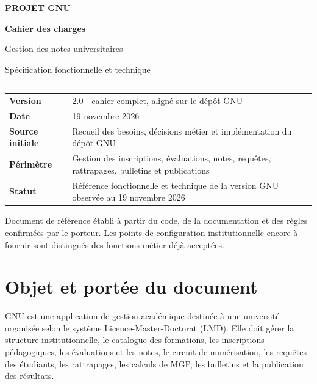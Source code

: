 \documentclass[11pt,a4paper]{article}
\begin{document}
\hypersetup{pageanchor=false}

\begin{titlepage}
\thispagestyle{empty}
\vspace*{2.2cm}
{\Large\bfseries\color{gnuGold} PROJET GNU\par}
\vspace{1.1cm}
{\huge\bfseries\color{gnuBlue} Cahier des charges\par}
\vspace{0.25cm}
{\LARGE Gestion des notes universitaires\par}
\vspace{0.8cm}
{\large Spécification fonctionnelle et technique\par}
\vspace{1.5cm}
\rule{\textwidth}{1pt}
\vspace{0.9cm}
\begin{tabularx}{\textwidth}{L{4.2cm}Y}
\textbf{Version} & 2.0 - cahier complet, aligné sur le dépôt GNU \\
\textbf{Date} & 19 novembre 2026 \\
\textbf{Source initiale} & Recueil des besoins, décisions métier et implémentation du dépôt GNU \\
\textbf{Périmètre} & Gestion des inscriptions, évaluations, notes, requêtes, rattrapages, bulletins et publications \\
\textbf{Statut} & Référence fonctionnelle et technique de la version GNU observée au 19 novembre 2026 \\
\end{tabularx}
\vfill
\textcolor{gnuGray}{Document de référence établi à partir du code, de la documentation et des règles confirmées par le porteur. Les points de configuration institutionnelle encore à fournir sont distingués des fonctions métier déjà acceptées.}
\end{titlepage}

\tableofcontents
\clearpage
\hypersetup{pageanchor=true}

\section{Objet et portée du document}

GNU est une application de gestion académique destinée à une université organisée selon le système Licence-Master-Doctorat (LMD). Elle doit gérer la structure institutionnelle, le catalogue des formations, les inscriptions pédagogiques, les évaluations et les notes, le circuit de numérisation, les requêtes des étudiants, les rattrapages, les calculs de MGP, les bulletins et la publication des résultats.
\end{document}
